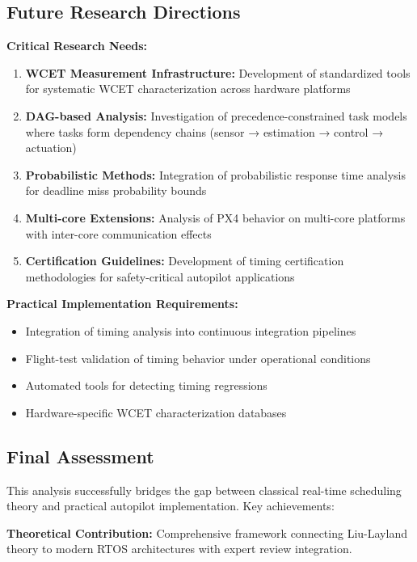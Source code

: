 \documentclass[12pt,a4paper]{article}
\begin{document}
\subsection{Future Research Directions}

\textbf{Critical Research Needs:}

\begin{enumerate}
\item \textbf{WCET Measurement Infrastructure:} Development of standardized tools for systematic WCET characterization across hardware platforms

\item \textbf{DAG-based Analysis:} Investigation of precedence-constrained task models where tasks form dependency chains (sensor → estimation → control → actuation)

\item \textbf{Probabilistic Methods:} Integration of probabilistic response time analysis for deadline miss probability bounds

\item \textbf{Multi-core Extensions:} Analysis of PX4 behavior on multi-core platforms with inter-core communication effects

\item \textbf{Certification Guidelines:} Development of timing certification methodologies for safety-critical autopilot applications
\end{enumerate}

\textbf{Practical Implementation Requirements:}
\begin{itemize}
\item Integration of timing analysis into continuous integration pipelines
\item Flight-test validation of timing behavior under operational conditions
\item Automated tools for detecting timing regressions
\item Hardware-specific WCET characterization databases
\end{itemize}

\subsection{Final Assessment}

This analysis successfully bridges the gap between classical real-time scheduling theory and practical autopilot implementation. Key achievements:

\textbf{Theoretical Contribution:} Comprehensive framework connecting Liu-Layland theory to modern RTOS architectures with expert review integration.
\end{document}
